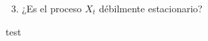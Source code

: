 \documentclass[../main.tex]{subfiles}
\begin{document}
    \vspace{1em}
    \begin{enunciado}
    	\begin{enumerate}
            \setcounter{enumi}{2}
    		\item ¿Es el proceso $X_t$ débilmente estacionario?
    	\end{enumerate}
    \end{enunciado}
    \begin{demostracion}
    	test
    \end{demostracion}
\end{document}
